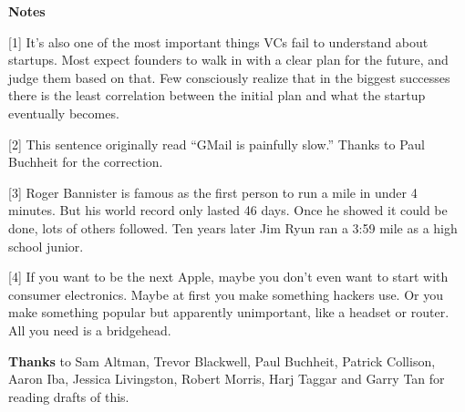 \textbf{Notes}

{[}1{]} It's also one of the most important things VCs fail to
understand about startups. Most expect founders to walk in with a clear
plan for the future, and judge them based on that. Few consciously
realize that in the biggest successes there is the least correlation
between the initial plan and what the startup eventually becomes.

{[}2{]} This sentence originally read ``GMail is painfully slow.''
Thanks to Paul Buchheit for the correction.

{[}3{]} Roger Bannister is famous as the first person to run a mile in
under 4 minutes. But his world record only lasted 46 days. Once he
showed it could be done, lots of others followed. Ten years later Jim
Ryun ran a 3:59 mile as a high school junior.

{[}4{]} If you want to be the next Apple, maybe you don't even want to
start with consumer electronics. Maybe at first you make something
hackers use. Or you make something popular but apparently unimportant,
like a headset or router. All you need is a bridgehead.

\textbf{Thanks} to Sam Altman, Trevor Blackwell, Paul Buchheit, Patrick
Collison, Aaron Iba, Jessica Livingston, Robert Morris, Harj Taggar and
Garry Tan for reading drafts of this.
